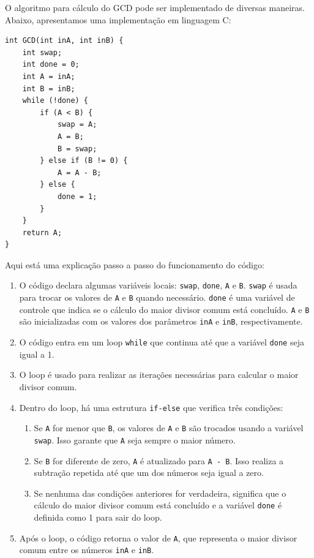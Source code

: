\documentclass[a4paper,11pt]{article} %
\begin{document}
O algoritmo para cálculo do GCD pode ser implementado de diversas maneiras.
Abaixo, apresentamos uma implementação em linguagem C:

\begin{verbatim}
int GCD(int inA, int inB) {
    int swap;
    int done = 0;
    int A = inA;
    int B = inB;
    while (!done) {
        if (A < B) {
            swap = A;
            A = B;
            B = swap;
        } else if (B != 0) {
            A = A - B;
        } else {
            done = 1;
        }
    }
    return A;
}
\end{verbatim}


Aqui está uma explicação passo a passo do funcionamento do código:
\begin{enumerate}
    \item O código declara algumas variáveis locais: \texttt{swap}, \texttt{done}, \texttt{A} e \texttt{B}. \texttt{swap} é usada para trocar os valores de \texttt{A} e \texttt{B} quando necessário. \texttt{done} é uma variável de controle que indica se o cálculo do maior divisor comum está concluído. \texttt{A} e \texttt{B} são inicializadas com os valores dos parâmetros \texttt{inA} e \texttt{inB}, respectivamente.
    \item O código entra em um loop \texttt{while} que continua até que a variável \texttt{done} seja igual a 1.
    \item O loop é usado para realizar as iterações necessárias para calcular o maior divisor comum.
    \item Dentro do loop, há uma estrutura \texttt{if-else} que verifica três condições:
    \begin{enumerate}
        \item Se \texttt{A} for menor que \texttt{B}, os valores de \texttt{A} e \texttt{B} são trocados usando a variável \texttt{swap}. Isso garante que \texttt{A} seja sempre o maior número.
        \item Se \texttt{B} for diferente de zero, \texttt{A} é atualizado para \texttt{A - B}. Isso realiza a subtração repetida até que um dos números seja igual a zero.
        \item Se nenhuma das condições anteriores for verdadeira, significa que o cálculo do maior divisor comum está concluído e a variável \texttt{done} é definida como 1 para sair do loop.
    \end{enumerate}
    \item Após o loop, o código retorna o valor de \texttt{A}, que representa o maior divisor comum entre os números \texttt{inA} e \texttt{inB}.
\end{enumerate}
\end{document}
